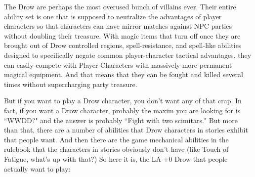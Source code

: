 
\vspace*{-8pt}

The Drow are perhaps the most overused bunch of villains ever. Their entire ability set is one that is supposed to neutralize the advantages of player characters so that characters can have mirror matches against NPC parties without doubling their treasure. With magic items that turn off once they are brought out of Drow controlled regions, spell-resistance, and spell-like abilities designed to specifically negate common player-character tactical advantages, they can easily compete with Player Characters with massively more permanent magical equipment. And that means that they can be fought and killed several times without supercharging party treasure.

But if you want to play a Drow character, you don't want any of that crap. In fact, if you want a Drow character, probably the maxim you are looking for is ``WWDD?" and the answer is probably ``Fight with two scimitars." But more than that, there are a number of abilities that Drow characters in stories exhibit that people want. And then there are the game mechanical abilities in the rulebook that the characters in stories obviously don't have (like Touch of Fatigue, what's up with that?) So here it is, the LA +0 Drow that people actually want to play:

